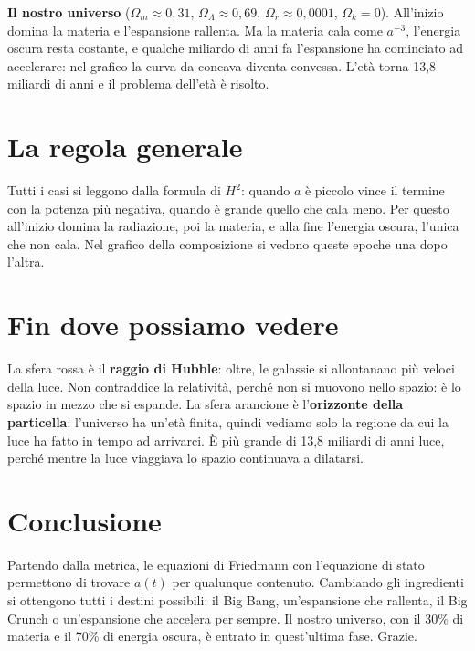 \documentclass[12pt,a4paper]{article}
\begin{document}
\textbf{Il nostro universo} ($\Omega_m \approx 0{,}31$, $\Omega_\Lambda \approx 0{,}69$, $\Omega_r \approx 0{,}0001$, $\Omega_k = 0$). All'inizio domina la materia e l'espansione rallenta. Ma la materia cala come $a^{-3}$, l'energia oscura resta costante, e qualche miliardo di anni fa l'espansione ha cominciato ad accelerare: nel grafico la curva da concava diventa convessa. L'età torna 13,8 miliardi di anni e il problema dell'età è risolto.

\section{La regola generale}
Tutti i casi si leggono dalla formula di $H^2$: quando $a$ è piccolo vince il termine con la potenza più negativa, quando è grande quello che cala meno. Per questo all'inizio domina la radiazione, poi la materia, e alla fine l'energia oscura, l'unica che non cala. Nel grafico della composizione si vedono queste epoche una dopo l'altra.

\section{Fin dove possiamo vedere}
La sfera rossa è il \textbf{raggio di Hubble}: oltre, le galassie si allontanano più veloci della luce. Non contraddice la relatività, perché non si muovono nello spazio: è lo spazio in mezzo che si espande. La sfera arancione è l'\textbf{orizzonte della particella}: l'universo ha un'età finita, quindi vediamo solo la regione da cui la luce ha fatto in tempo ad arrivarci. È più grande di 13,8 miliardi di anni luce, perché mentre la luce viaggiava lo spazio continuava a dilatarsi.

\section{Conclusione}
Partendo dalla metrica, le equazioni di Friedmann con l'equazione di stato permettono di trovare $a(t)$ per qualunque contenuto. Cambiando gli ingredienti si ottengono tutti i destini possibili: il Big Bang, un'espansione che rallenta, il Big Crunch o un'espansione che accelera per sempre. Il nostro universo, con il 30\% di materia e il 70\% di energia oscura, è entrato in quest'ultima fase. Grazie.
\end{document}
